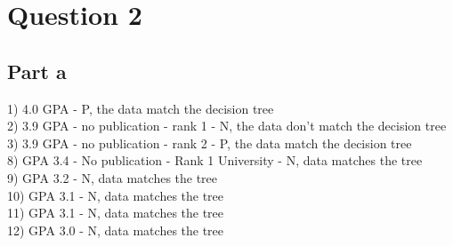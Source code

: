 \documentclass[12pt]{article}
\begin{document}
\section*{Question 2}

\subsection*{Part a}

1) 4.0 GPA - P, the data match the decision tree\\
2) 3.9 GPA - no publication - rank 1 - N, the data don't match the decision tree\\
3) 3.9 GPA - no publication - rank 2 - P, the data match the decision tree\\

8) GPA 3.4 - No publication - Rank 1 University - N, data matches the tree\\
9) GPA 3.2 - N, data matches the tree\\
10) GPA 3.1 - N, data matches the tree\\
11) GPA 3.1 - N, data matches the tree\\
12) GPA 3.0 - N, data matches the tree\\
\end{document}
